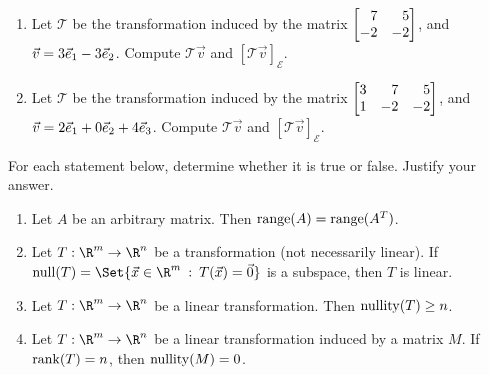 \begin{exercises}
\begin{problist}
		\prob 
		\begin{enumerate}
			\item Let $\mathcal T$ be the transformation induced by the
				matrix $\mat{7&5\\-2&-2}$, and
				$\vec v=3{\vec e_1}-3{\vec e_2}$.
				Compute $\mathcal T\vec v$ and $[\mathcal T\vec v]_{\mathcal E}$.

			\item Let $\mathcal T$ be the transformation induced by the
				matrix $\mat{3&7&5\\1&-2&-2}$, and
				$\vec v=2{\vec e_1}+0{\vec e_2}+4{\vec e_3}$.
				Compute $\mathcal T\vec v$ and $[\mathcal T\vec v]_{\mathcal E}$.
		\end{enumerate}

		\prob For each statement below, determine whether it is true or false. Justify your answer.
		\begin{enumerate}
			\item Let $A$ be an arbitrary matrix. Then $\operatorname{range}(A)=\operatorname{range}(A^{T})$.

			\item Let $T:\R^{m}\to\R^{n}$ be a transformation (not necessarily
				linear). If $\Null(T)=\Set{\vec x\in\R^m \given T(\vec x)=\vec 0}$
				is a subspace, then $T$ is linear.

			\item Let $T:\R^{m}\to\R^{n}$ be a linear transformation.
				Then $\operatorname{nullity}(T) \geq n$.

			\item Let $T:\R^{m}\to\R^{n}$ be a linear transformation
				induced by a matrix $M$. If
				$\operatorname{rank}(T) = n$, then $\operatorname{nullity}(M) = 0$.
		\end{enumerate}
	\end{problist}
\end{exercises}
